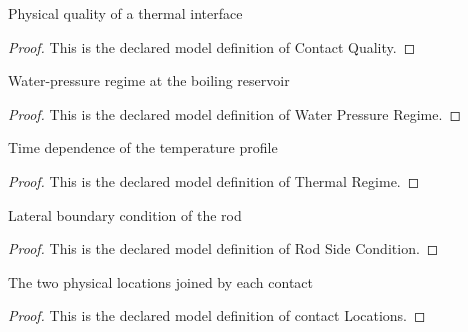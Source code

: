 \begin{definition}
  \label{def:physics:phyx-mini-0331:phyxminiproblems-problemphyxmini0331-contactquality}
  Physical quality of a thermal interface
\end{definition}
\begin{proof}
  This is the declared model definition of Contact Quality.
\end{proof}
\begin{definition}
  \label{def:physics:phyx-mini-0331:phyxminiproblems-problemphyxmini0331-waterpressureregime}
  Water-pressure regime at the boiling reservoir
\end{definition}
\begin{proof}
  This is the declared model definition of Water Pressure Regime.
\end{proof}
\begin{definition}
  \label{def:physics:phyx-mini-0331:phyxminiproblems-problemphyxmini0331-thermalregime}
  Time dependence of the temperature profile
\end{definition}
\begin{proof}
  This is the declared model definition of Thermal Regime.
\end{proof}
\begin{definition}
  \label{def:physics:phyx-mini-0331:phyxminiproblems-problemphyxmini0331-rodsidecondition}
  Lateral boundary condition of the rod
\end{definition}
\begin{proof}
  This is the declared model definition of Rod Side Condition.
\end{proof}
\begin{definition}
  \label{def:physics:phyx-mini-0331:phyxminiproblems-problemphyxmini0331-contactlocations}
  The two physical locations joined by each contact
\end{definition}
\begin{proof}
  This is the declared model definition of contact Locations.
\end{proof}
